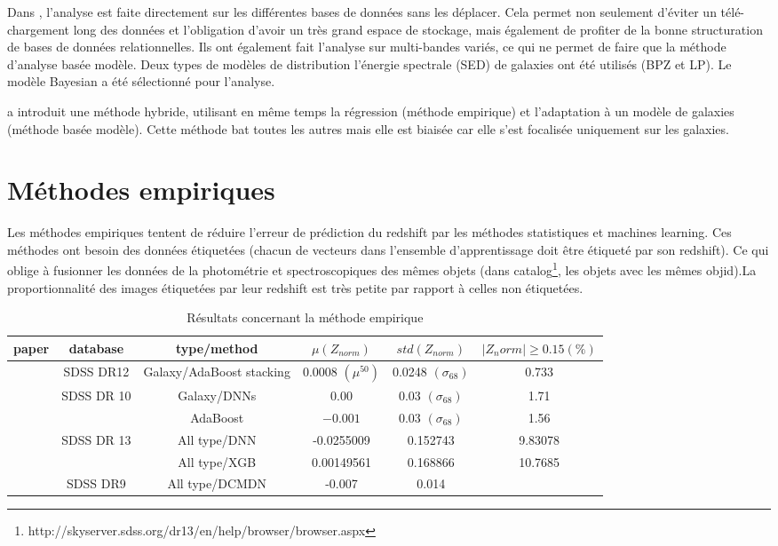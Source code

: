 Dans \cite{sql}, l'analyse est faite directement sur les différentes bases de données sans les déplacer. Cela permet non seulement d'éviter un télé-chargement long des données et l'obligation d'avoir un très grand espace de stockage, mais également de profiter de la bonne structuration de bases de données relationnelles. Ils ont également fait l'analyse sur multi-bandes variés, ce qui ne permet de faire que la méthode d'analyse basée modèle. Deux types de modèles de distribution l'énergie spectrale (SED) de galaxies ont été utilisés (BPZ et LP). Le modèle Bayesian a été sélectionné pour l'analyse. 

\cite{photoredSDSS} a introduit une méthode hybride, utilisant en même temps la régression (méthode empirique) et l'adaptation à un modèle de galaxies (méthode basée modèle). Cette méthode bat toutes les autres mais elle est biaisée car elle s'est focalisée uniquement sur les galaxies.

\section{Méthodes empiriques}
Les méthodes empiriques tentent de réduire l'erreur de prédiction du redshift par les méthodes statistiques et machines learning. Ces méthodes ont besoin des données étiquetées (chacun de vecteurs dans l'ensemble d'apprentissage doit être étiqueté par son redshift). Ce qui oblige à fusionner les données de la photométrie et spectroscopiques des mêmes objets (dans catalog\footnote{http://skyserver.sdss.org/dr13/en/help/browser/browser.aspx}, les objets avec les mêmes objid).La proportionnalité des images étiquetées par leur redshift est très petite par rapport à celles non étiquetées.  

\begin{table}[!ht]
\centering    
\begin{tabular}{|c|c|c|c|c|c|}
    \hline paper & database & type/method & $\mu(Z_{norm})$ & $std(Z_{norm})$ & $|Z_norm|\ge0.15 (\%)$\\
    
    \hline 
    \cite{stack} & SDSS DR12 & Galaxy/AdaBoost stacking & 0.0008 $(\mu^{50})$ & 0.0248 $(\sigma_{68})$ & 0.733 \\
    \hline
    
    \multirow{2}{1cm}{\cite{ben}} & \multirow{2}{1cm}{SDSS DR 10} & Galaxy/DNNs & 0.00 & 0.03 $(\sigma_{68})$ & 1.71 \\
    \cline{3-6}
    & & AdaBoost & $-0.001$ & 0.03 $(\sigma_{68})$ & 1.56\\
    
    \hline
        \multirow{2}{1cm}{\cite{meuphirim}} & \multirow{2}{1cm}{SDSS DR 13}  & All type/DNN & -0.0255009 & 0.152743 & 9.83078\\
        \cline{3-6}
        & & All type/XGB & 0.00149561 & 0.168866 & 10.7685 \\
    \hline
        \cite{isanto} & SDSS DR9 & All type/DCMDN & -0.007 & 0.014 & \\
    \hline
    
\end{tabular}
    \caption{Résultats concernant la méthode empirique}
    \label{empirique}
\end{table}

